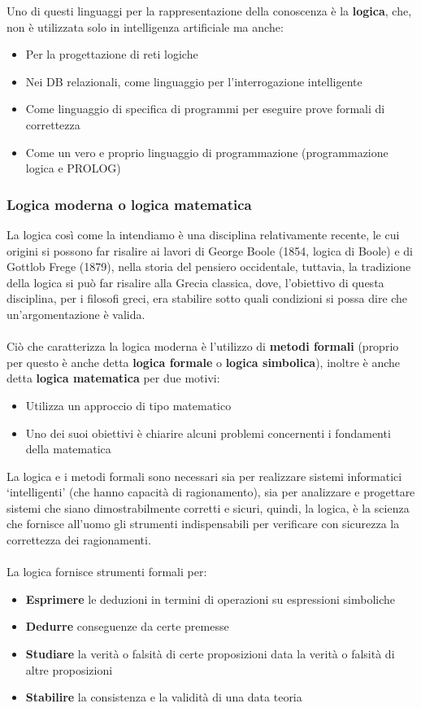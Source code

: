 \documentclass[../main.tex]{subfiles}
\begin{document}
	Uno di questi linguaggi per la rappresentazione della conoscenza è la \textbf{logica}, che, non è utilizzata solo in intelligenza artificiale ma anche:
	\begin{itemize}
		\item Per la progettazione di reti logiche
		\item Nei DB relazionali, come linguaggio per l'interrogazione intelligente
		\item Come linguaggio di specifica di programmi per eseguire prove formali di correttezza
		\item Come un vero e proprio linguaggio di programmazione (programmazione logica e PROLOG)
	\end{itemize}
	\subsubsection{Logica moderna o logica matematica}
	La logica così come la intendiamo è una disciplina relativamente recente, le cui origini si possono far risalire ai lavori di George Boole (1854, logica di Boole) e di Gottlob Frege (1879), nella storia del pensiero occidentale, tuttavia, la tradizione della logica si può far risalire alla Grecia classica, dove, l'obiettivo di questa disciplina, per i filosofi greci, era stabilire sotto quali condizioni si possa dire che un'argomentazione è valida.\\\\
	Ciò che caratterizza la logica moderna è l’utilizzo di \textbf{metodi formali} (proprio per questo è anche detta \textbf{logica formale} o \textbf{logica simbolica}), inoltre è anche detta \textbf{logica matematica} per due motivi:
	\begin{itemize}
		\item Utilizza un approccio di tipo matematico
		\item Uno dei suoi obiettivi è chiarire alcuni problemi concernenti i fondamenti della matematica
	\end{itemize}
	La logica e i metodi formali sono necessari sia per realizzare sistemi informatici ‘intelligenti’ (che hanno capacità di ragionamento), sia per analizzare e progettare sistemi che siano dimostrabilmente corretti e sicuri, quindi, la logica, è la scienza che fornisce all'uomo gli strumenti indispensabili per verificare con sicurezza la correttezza dei ragionamenti.\\\\
	La logica fornisce strumenti formali per:
	\begin{itemize}
		\item \textbf{Esprimere} le deduzioni in termini di operazioni su espressioni simboliche
		\item \textbf{Dedurre} conseguenze da certe premesse
		\item \textbf{Studiare} la verità o falsità di certe proposizioni data la verità o falsità di altre proposizioni
		\item \textbf{Stabilire} la consistenza e la validità di una data teoria
	\end{itemize}
\end{document}
